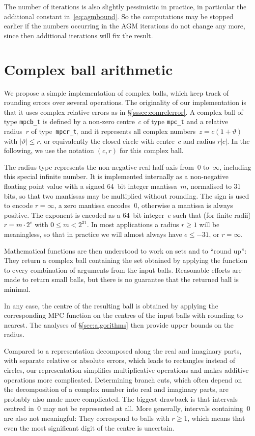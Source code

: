 \documentclass [11pt]{article}
\renewcommand {\theta}{\vartheta}
\renewcommand {\leq}{\leqslant}
\renewcommand {\geq}{\geqslant}
\begin{document}
The number of iterations is also slightly pessimistic in practice,
in particular the additional constant in~\eqref {eq:agmbound}.
So the computations may be stopped earlier if the numbers occurring in
the AGM iterations do not change any more, since then additional
iterations will fix the result.

\section {Complex ball arithmetic}

We propose a simple implementation of complex balls, which keep track of
rounding errors over several operations.
The originality of our implementation is that it uses complex relative
errors as in \S\ref {sssec:comrelerror}. A complex ball of type
\texttt {mpcb\_t} is defined by a non-zero centre~$c$ of type
\texttt {mpc\_t} and a relative radius~$r$ of type~\texttt {mpcr\_t},
and it represents all complex numbers~$z = c (1 + \theta)$ with
$|\theta| \leq r$, or equivalently the closed circle with centre~$c$ and
radius $r |c|$.
In the following, we use the notation $(c, r)$ for this complex ball.

The radius type represents the non-negative real half-axis from~$0$
to~$\infty$, including this special infinite number. It is implemented
internally as a non-negative floating point value with a signed 64~bit
integer mantissa~$m$, normalised to 31 bits, so that two mantissas may be
multiplied without rounding. The sign is used to encode $r = \infty$,
a zero mantissa encodes~$0$, otherwise a mantissa is always positive.
The exponent is encoded as a 64~bit integer~$e$ such that (for finite radii)
$r = m \cdot 2^e$ with $0 \leq m < 2^{31}$.
In most applications a radius $r \geq 1$ will be meaningless, so that
in practice we will almost always have $e \leq -31$, or $r = \infty$.

Mathematical functions are then understood to work on sets and to ``round
up'': They return a complex ball containing the set obtained by applying
the function to every combination of arguments from the input balls.
Reasonable efforts are made to return small balls, but there is no
guarantee that the returned ball is minimal.

In any case, the centre of the resulting ball is obtained by applying
the corresponding MPC function on the centres of the input balls with
rounding to nearest. The analyses of \S\ref {sec:algorithms} then provide
upper bounds on the radius.

Compared to a representation decomposed along the real and imaginary parts,
with separate relative or absolute errors, which leads to rectangles
instead of circles, our representation simplifies multiplicative operations
and makes additive operations more complicated. Determining branch cuts,
which often depend on the decomposition of a complex number into real and
imaginary parts, are probably also made more complicated.
The biggest drawback is that intervals centred in~$0$ may not be
represented at all. More generally, intervals containing~$0$ are also
not meaningful: They correspond to balls with $r \geq 1$, which means that
even the most significant digit of the centre is uncertain.
\end{document}
